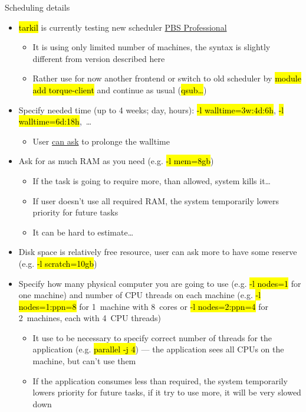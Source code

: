 \documentclass[compress, ucs, xelatex, 11pt, xcolor=svgnames,
  hyperref={
    bookmarks=true,
    unicode=true,
    colorlinks=true,
    pdftitle={Linux, command line and MetaCentrum},
    plainpages=false,
    pdfauthor={Vojtech Zeisek},
    pdfsubject={Course about use of Linux command line, writing shell scripts and using MetaCentrum of CESNET},
    pdfcreator={XeLaTeX},
    pdfkeywords={Linux, GNU, BASH, shell, command line, MetaCentrum},
    linkcolor=DarkRed,
    anchorcolor=DarkBlue,
    citecolor=Indigo,
    filecolor=NavyBlue,
    menucolor=DarkMagenta,
    urlcolor=DarkBlue,
    pdftex},
  url={hyphens, lowtilde} %
  ]{beamer}
\renewcommand{\texttt}[1]{\hl{\ttfamily #1}}
\begin{document}
\begin{frame}[allowframebreaks]{Scheduling details} %
  \begin{itemize}
    \item \texttt{tarkil} is currently testing new scheduler \href{https://wiki.metacentrum.cz/wiki/PBS_Professional}{PBS Professional}
    \begin{itemize}
      \item It is using only limited number of machines, the syntax is slightly different from version described here
      \item Rather use for now another frontend or switch to old scheduler by \texttt{module add torque-client} and continue as usual (\texttt{qsub\ldots})
    \end{itemize}
    \item Specify needed time (up to 4 weeks; day, hours): \texttt{-l walltime=3w:4d:6h}, \texttt{-l walltime=6d:18h},~\ldots
    \begin{itemize}
      \item User \href{mailto:meta@cesnet.cz}{can ask} to prolonge the walltime
    \end{itemize}
    \item Ask for as much RAM as you need (e.g. \texttt{-l mem=8gb})
    \begin{itemize}
      \item If the task is going to require more, than allowed, system kills it\ldots
      \item If user doesn't use all required RAM, the system temporarily lowers priority for future tasks
      \item It can be hard to estimate\ldots
    \end{itemize}
    \item Disk space is relatively free resource, user can ask more to have some reserve (e.g. \texttt{-l scratch=10gb})
    \item Specify how many physical computer you are going to use (e.g. \texttt{-l nodes=1} for one machine) and number of CPU threads on each machine (e.g. \texttt{-l nodes=1:ppn=8} for 1~machine with 8~cores or \texttt{-l nodes=2:ppn=4} for 2~machines, each with 4~CPU threads)
    \begin{itemize}
      \item It use to be necessary to specify correct number of threads for the application (e.g. \texttt{parallel -j 4}) --- the application sees all CPUs on the machine, but can't use them
      \item If the application consumes less than required, the system temporarily lowers priority for future tasks, if it try to use more, it will be very slowed down

\end{itemize}
\end{itemize}
\end{frame}
\end{document}
